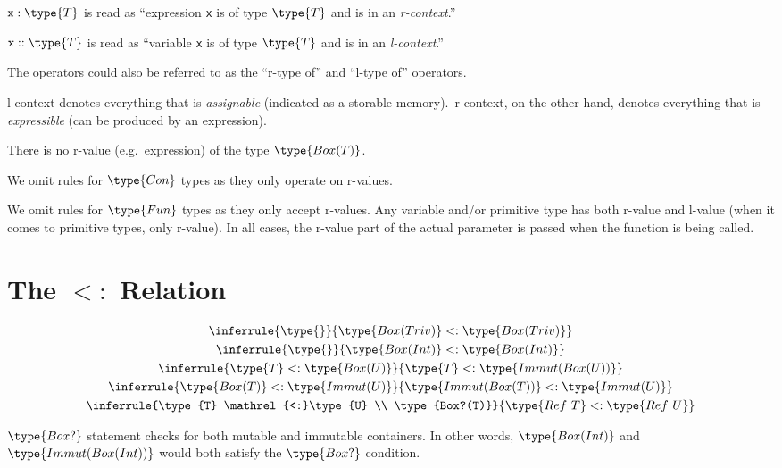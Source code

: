 \documentclass[11pt]{article}
\newcommand\subtype{\mathrel{<:}}
\newcommand{\syntax}{\texttt}
\begin{document}
$\syntax{x} : \type{T}$ is read as ``expression \syntax{x} is of type
$\type{T}$ and is in an \textit{r-context}.''

$\syntax{x} :: \type{T}$ is read as ``variable \syntax{x} is of type $\type{T}$
and is in an \textit{l-context}.''

The operators could also be referred to as the ``r-type of'' and ``l-type of''
operators.

\medskip

l-context denotes everything that is \textit{assignable} (indicated as a
storable memory).\ r-context, on the other hand, denotes everything that is
\textit{expressible} (can be produced by an expression).

\medskip

There is no r-value (e.g.\ expression) of the type $\type{Box(T)}$.

\medskip

We omit rules for $\type{Con}$ types as they only operate on r-values.

\medskip

We omit rules for $\type{Fun}$ types as they only accept r-values.
Any variable and/or primitive type has both r-value and l-value (when it comes
to primitive types, only r-value). In all cases, the r-value part of the actual
parameter is passed when the function is being called.


\section*{The $\subtype$ Relation}

\begin{gather}
  \inferrule{\type{}}{\type{Box(Triv)} \subtype \type{Box(Triv)}}\\
  \inferrule{\type{}}{\type{Box(Int)} \subtype \type{Box(Int)}}\\
  \inferrule{\type{T} \subtype \type{Box(U)}}{\type{T} \subtype \type{Immut(Box(U))}}\\
  \inferrule{\type{Box(T)} \subtype \type{Immut(U)}}{\type{Immut(Box(T))} \subtype \type{Immut(U)}}\\
  \inferrule{\type{T} \subtype \type{U} \\ \type{Box?(T)}}{\type{Ref\ T} \subtype \type{Ref\ U}}
\end{gather}

$\type{Box?}$ statement checks for both mutable and immutable containers.
In other words, $\type{Box(Int)}$ and $\type{Immut(Box(Int))}$ would both
satisfy the $\type{Box?}$ condition.

\end{document}
